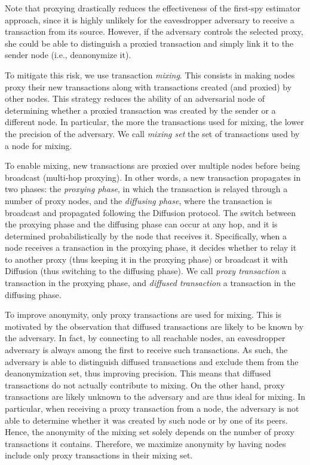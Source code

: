 \documentclass{article}
\begin{document}
	Note that proxying drastically reduces the effectiveness of the first-spy estimator approach, since it is highly unlikely for the eavesdropper adversary to receive a transaction from its source.
	However, if the adversary controls the selected proxy, she could be able to distinguish a proxied transaction and simply link it to the sender node (i.e., deanonymize it).
	
	To mitigate this risk, we use transaction \textit{mixing}.
	This consists in making nodes proxy their new transactions along with transactions created (and proxied) by other nodes.
	This strategy reduces the ability of an adversarial node of determining whether a proxied transaction was created by the sender or a different node.
	In particular, the more the transactions used for mixing, the lower the precision of the adversary.
	We call \textit{mixing set} the set of transactions used by a node for mixing.
	
	To enable mixing, new transactions are proxied over multiple nodes before being broadcast (multi-hop proxying).
	In other words, a new transaction propagates in two phases: the \textit{proxying phase}, in which the transaction is relayed through a number of proxy nodes, and the \textit{diffusing phase}, where the transaction is broadcast and propagated following the Diffusion protocol.
	The switch between the proxying phase and the diffusing phase can occur at any hop, and it is determined probabilistically by the node that receives it.
	Specifically, when a node receives a transaction in the proxying phase, it decides whether to relay it to another proxy (thus keeping it in the proxying phase) or broadcast it with Diffusion (thus switching to the diffusing phase).
	We call \textit{proxy transaction} a transaction in the proxying phase, and \textit{diffused transaction} a transaction in the diffusing phase.
	
	To improve anonymity, only proxy transactions are used for mixing.
	This is motivated by the observation that diffused transactions are likely to be known by the adversary.
	In fact, by connecting to all reachable nodes, an eavesdropper adversary is always among the first to receive such transactions.
	As such, the adversary is able to distinguish diffused transactions and exclude them from the deanonymization set, thus improving precision.
	This means that diffused transactions do not actually contribute to mixing.
	On the other hand, proxy transactions are likely unknown to the adversary and are thus ideal for mixing.
	In particular, when receiving a proxy transaction from a node, the adversary is not able to determine whether it was created by such node or by one of its peers.
	Hence, the anonymity of the mixing set solely depends on the number of proxy transactions it contains.
	Therefore, we maximize anonymity by having nodes include only proxy transactions in their mixing set.
	
\end{document}
